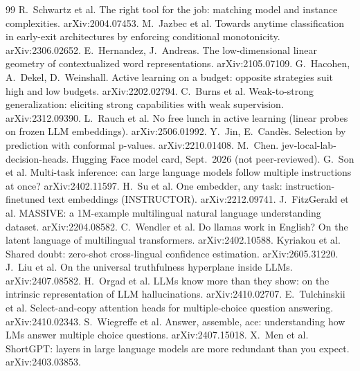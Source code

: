 \documentclass[11pt,a4paper]{article}
\begin{document}
\begin{thebibliography}{99}
 R.~Schwartz et al. The right tool for the job: matching model and instance complexities. arXiv:2004.07453.
 M.~Jazbec et al. Towards anytime classification in early-exit architectures by enforcing conditional monotonicity. arXiv:2306.02652.
 E.~Hernandez, J.~Andreas. The low-dimensional linear geometry of contextualized word representations. arXiv:2105.07109.
 G.~Hacohen, A.~Dekel, D.~Weinshall. Active learning on a budget: opposite strategies suit high and low budgets. arXiv:2202.02794.
 C.~Burns et al. Weak-to-strong generalization: eliciting strong capabilities with weak supervision. arXiv:2312.09390.
 L.~Rauch et al. No free lunch in active learning (linear probes on frozen LLM embeddings). arXiv:2506.01992.
 Y.~Jin, E.~Cand\`es. Selection by prediction with conformal p-values. arXiv:2210.01408.
 M.~Chen. jev-local-lab-decision-heads. Hugging Face model card, Sept.~2026 (not peer-reviewed).
 G.~Son et al. Multi-task inference: can large language models follow multiple instructions at once? arXiv:2402.11597.
 H.~Su et al. One embedder, any task: instruction-finetuned text embeddings (INSTRUCTOR). arXiv:2212.09741.
 J.~FitzGerald et al. MASSIVE: a 1M-example multilingual natural language understanding dataset. arXiv:2204.08582.
 C.~Wendler et al. Do llamas work in English? On the latent language of multilingual transformers. arXiv:2402.10588.
 Kyriakou et al. Shared doubt: zero-shot cross-lingual confidence estimation. arXiv:2605.31220.
 J.~Liu et al. On the universal truthfulness hyperplane inside LLMs. arXiv:2407.08582.
 H.~Orgad et al. LLMs know more than they show: on the intrinsic representation of LLM hallucinations. arXiv:2410.02707.
 E.~Tulchinskii et al. Select-and-copy attention heads for multiple-choice question answering. arXiv:2410.02343.
 S.~Wiegreffe et al. Answer, assemble, ace: understanding how LMs answer multiple choice questions. arXiv:2407.15018.
 X.~Men et al. ShortGPT: layers in large language models are more redundant than you expect. arXiv:2403.03853.

\end{thebibliography}

\appendix
\end{document}
